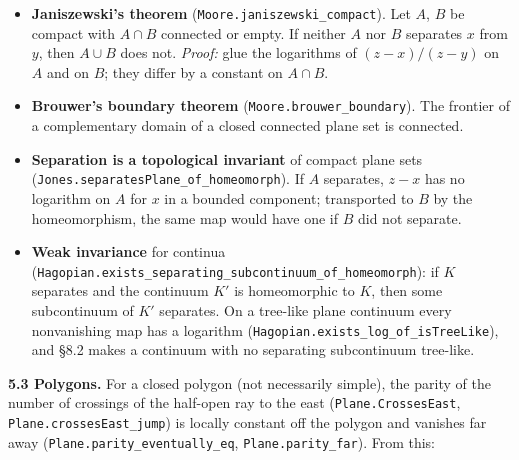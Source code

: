 \documentclass[11pt]{article}
\newcommand{\lean}[1]{\texttt{#1}}
\begin{document}
\begin{itemize}
  \item \textbf{Janiszewski's theorem} (\lean{Moore.\hspace{0pt}janiszewski\_\hspace{0pt}compact}). Let $A$, $B$ be compact with $A \cap B$ connected or empty. If neither $A$ nor $B$ separates $x$ from $y$, then $A \cup B$ does not. \emph{Proof:} glue the logarithms of $(z - x)/(z - y)$ on $A$ and on $B$; they differ by a constant on $A \cap B$.
  \item \textbf{Brouwer's boundary theorem} (\lean{Moore.\hspace{0pt}brouwer\_\hspace{0pt}boundary}). The frontier of a complementary domain of a closed connected plane set is connected.
  \item \textbf{Separation is a topological invariant} of compact plane sets (\lean{Jones.\hspace{0pt}separatesPlane\_\hspace{0pt}of\_\hspace{0pt}homeomorph}). If $A$ separates, $z - x$ has no logarithm on $A$ for $x$ in a bounded component; transported to $B$ by the homeomorphism, the same map would have one if $B$ did not separate.
  \item \textbf{Weak invariance} for continua (\lean{Hagopian.\hspace{0pt}exists\_\hspace{0pt}separating\_\hspace{0pt}subcontinuum\_\hspace{0pt}of\_\hspace{0pt}homeomorph}): if $K$ separates and the continuum $K'$ is homeomorphic to $K$, then some subcontinuum of $K'$ separates. On a tree-like plane continuum every nonvanishing map has a logarithm (\lean{Hagopian.\hspace{0pt}exists\_\hspace{0pt}log\_\hspace{0pt}of\_\hspace{0pt}isTreeLike}), and \S{}8.2 makes a continuum with no separating subcontinuum tree-like.
\end{itemize}

\textbf{5.3 Polygons.} For a closed polygon (not necessarily simple), the parity of the number of crossings of the half-open ray to the east (\lean{Plane.\hspace{0pt}CrossesEast}, \lean{Plane.\hspace{0pt}crossesEast\_\hspace{0pt}jump}) is locally constant off the polygon and vanishes far away (\lean{Plane.\hspace{0pt}parity\_\hspace{0pt}eventually\_\hspace{0pt}eq}, \lean{Plane.\hspace{0pt}parity\_\hspace{0pt}far}). From this:
\end{document}
